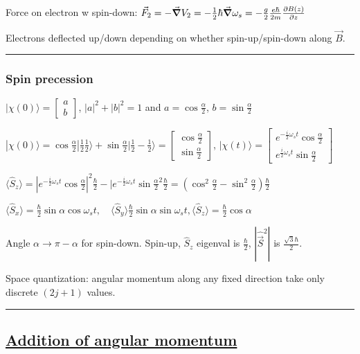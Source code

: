 Force on electron w spin-down: $\vec{F}_2 = -\vec{\grad} V_2 = -\frac{1}{2} \hbar \vec{\grad} \omega_s = - \frac{g}{2} \frac{e \hbar}{2m} \pdv{B(z)}{z}$

Electrons deflected up/down depending on whether spin-up/spin-down along $\vec{B}$.

\hrule height 0.05pt

\subsubsection{Spin precession}

$| \chi(0) \rangle = \begin{bmatrix} a \\ b \end{bmatrix}$, $|a|^2 + |b|^2 = 1$ and $a = \cos \frac{\alpha}{2}$, $b = \sin \frac{\alpha}{2}$

$|\chi (0) \rangle = \cos \frac{\alpha}{2} | \frac{1}{2} \frac{1}{2} \rangle + \sin \frac{\alpha}{2} | \frac{1}{2} -\frac{1}{2} \rangle = \begin{bmatrix} \cos \frac{\alpha}{2} \\ \sin \frac{\alpha}{2} \end{bmatrix}$, 
\tiny
$|\chi(t) \rangle = \begin{bmatrix} e^{-\frac{i}{2} \omega_s t} \cos \frac{\alpha}{2} \\ e^{\frac{i}{2} \omega_s t} \sin \frac{\alpha}{2} \end{bmatrix}$
\scriptsize

$\langle \widehat{S}_z \rangle = | e^{-\frac{i}{2} \omega_s t} \cos \frac{\alpha}{2}|^2 \frac{\hbar}{2} - |e^{-\frac{i}{2} \omega_s t} \sin \frac{\alpha}{2}^2 \frac{\hbar}{2} = (\cos^2 \frac{\alpha}{2} - \sin^2 \frac{\alpha}{2}) \frac{\hbar}{2}$

$\langle \widehat{S}_x \rangle = \frac{\hbar}{2} \sin \alpha \cos \omega_s t, \quad \langle \widehat{S}_y \rangle \frac{\hbar}{2} \sin \alpha \sin \omega_s t, \langle \widehat{S}_z \rangle = \frac{\hbar}{2} \cos \alpha$

Angle $\alpha \rightarrow \pi - \alpha$ for spin-down. Spin-up, $\widehat{S}_z$ eigenval is $\frac{\hbar}{2}$, $|\widehat{\vec{S}}^2|$ is $\frac{\sqrt{3} \hbar}{2}$.

Space quantization: angular momentum along any fixed direction take only discrete $(2j+1)$ values.

\hrule height 0.05pt

\subsection{\underline{Addition of angular momentum}}

